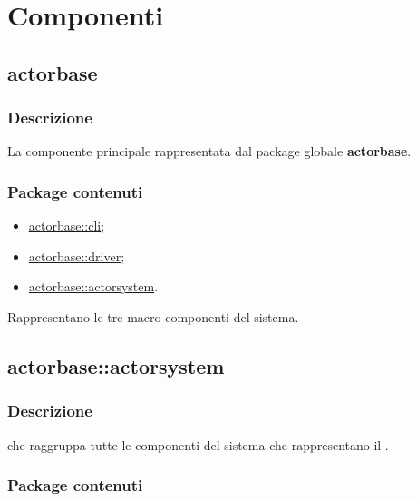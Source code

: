 \documentclass{scalatekids-article}
\begin{document}
\section{Componenti}

\subsection{actorbase}
\label{sec:actorbase}

\subsubsection{Descrizione}

La componente principale rappresentata dal package globale \textbf{actorbase}.

\subsubsection{Package contenuti}

\begin{itemize}
\item \hyperref[sec:actorbase::cli]{actorbase::cli};
\item \hyperref[sec:actorbase::driver]{actorbase::driver};
\item \hyperref[sec:actorbase::actorsystem]{actorbase::actorsystem}.
\end{itemize}

Rappresentano le tre macro-componenti del sistema.


\subsection{actorbase::actorsystem}
\label{sec:actorbase::actorsystem}

\subsubsection{Descrizione}

 che raggruppa tutte le componenti del sistema che
rappresentano il .

\subsubsection{Package contenuti}
\end{document}
